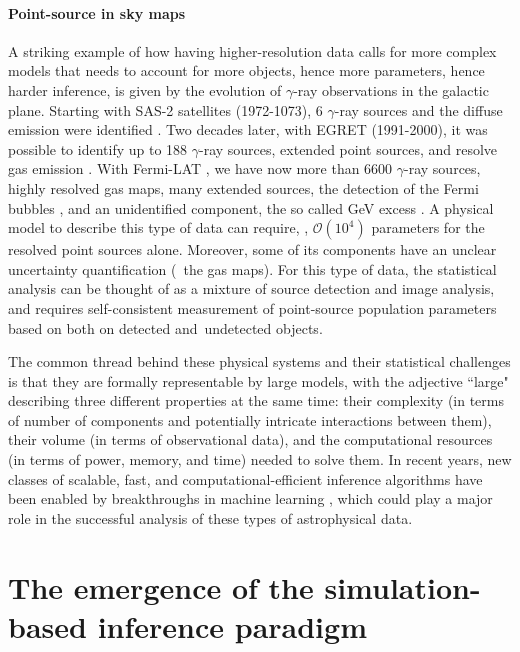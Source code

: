 \paragraph{Point-source in sky maps} 
A striking example of how having higher-resolution data calls for more complex models that needs to account for more objects, hence more parameters, hence harder inference, is given by the evolution of $\gamma$-ray observations in the galactic plane. Starting with SAS-2 satellites (1972-1073), 6 $\gamma$-ray sources and the diffuse emission were identified \cite{Sas26ps, sas2}. Two decades later, with EGRET (1991-2000), it was possible to identify up to 188 $\gamma$-ray sources, extended point sources, and resolve gas emission \cite{Casandjian:2008ky}. With Fermi-LAT \cite{Fermi-LAT:2022byn}, we have now more than 6600  $\gamma$-ray sources, highly resolved gas maps, many extended sources, the detection of the Fermi bubbles \cite{dobler2010fermi}, and an unidentified component, the so called GeV excess \cite{Goodenough:2009gk}. A physical model to describe this type of data can require, \eg, $\mathcal{O}(10^4)$ parameters for the resolved point sources alone. Moreover, some of its components have an unclear uncertainty quantification (\eg\ the gas maps). For this type of data, the statistical analysis can be thought of as a mixture of source detection and image analysis, and requires self-consistent measurement of point-source population parameters based on both on detected and undetected objects.
          
The common thread behind these physical systems and their statistical challenges is that they are formally representable by large models, with the adjective ``large" describing three different properties at the same time: their complexity (in terms of number of components and potentially intricate interactions between them), their volume (in terms of observational data), and the computational resources (in terms of power, memory, and time) needed to solve them. In recent years, new classes of scalable, fast, and computational-efficient inference algorithms have been enabled by breakthroughs in machine learning \cite{Murphy:book}, which could play a major role in the successful analysis of these types of astrophysical data.


\section{The emergence of the simulation-based inference paradigm} \label{sec:paradigm}


